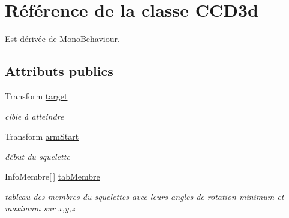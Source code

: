 \hypertarget{class_c_c_d3d}{\section{Référence de la classe C\+C\+D3d}
\label{class_c_c_d3d}
}


Est dérivée de Mono\+Behaviour.

\subsection*{Attributs publics}
\begin{DoxyCompactItemize}
\item 
\hypertarget{class_c_c_d3d_a8a24b37582e07ee23646b165d54fa600}{Transform \hyperlink{class_c_c_d3d_a8a24b37582e07ee23646b165d54fa600}{target}}\label{class_c_c_d3d_a8a24b37582e07ee23646b165d54fa600}

\begin{DoxyCompactList}\small\item\em cible à atteindre \end{DoxyCompactList}\item 
\hypertarget{class_c_c_d3d_a2eead529af518997fa586c6a009cfa77}{Transform \hyperlink{class_c_c_d3d_a2eead529af518997fa586c6a009cfa77}{arm\+Start}}\label{class_c_c_d3d_a2eead529af518997fa586c6a009cfa77}

\begin{DoxyCompactList}\small\item\em début du squelette \end{DoxyCompactList}\item 
\hypertarget{class_c_c_d3d_a122c5917b76f173bf2d412149c2e93c5}{Info\+Membre\mbox{[}$\,$\mbox{]} \hyperlink{class_c_c_d3d_a122c5917b76f173bf2d412149c2e93c5}{tab\+Membre}}\label{class_c_c_d3d_a122c5917b76f173bf2d412149c2e93c5}

\begin{DoxyCompactList}\small\item\em tableau des membres du squelettes avec leurs angles de rotation minimum et maximum sur x,y,z \end{DoxyCompactList}\end{DoxyCompactItemize}
